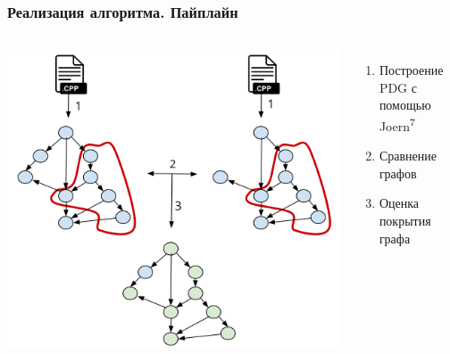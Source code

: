 \documentclass[10pt]{beamer}
\begin{document}
\begin{frame}[fragile]\frametitle{Реализация алгоритма. Пайплайн}
	\begin{columns}
		\hspace*{-0.6cm}\includegraphics[scale=0.6]{algo.png}
		\centering
		\begin{enumerate}
			\item Построение PDG с помощью Joern\textsuperscript{7}
			\newline
			\item Сравнение графов
			\newline
			\newline
			\item Оценка покрытия графа
		\end{enumerate}
	    \vspace{2cm}
	\end{columns}
\end{frame}
    
\end{document}
